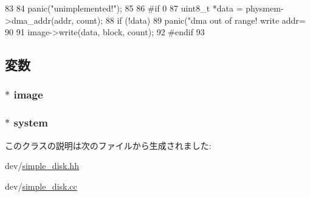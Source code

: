 \begin{DoxyCode}
83 {
84     panic("unimplemented!\n");
85 
86 #if 0
87     uint8_t *data = physmem->dma_addr(addr, count);
88     if (!data)
89         panic("dma out of range! write addr=%
90 
91     image->write(data, block, count);
92 #endif
93 }
\end{DoxyCode}


\subsection{変数}
\hypertarget{classSimpleDisk_a86d47120637a95e3a6876c774d768030}{
\subsubsection[{image}]{$\ast$ {\bf image}}}
\label{classSimpleDisk_a86d47120637a95e3a6876c774d768030}
\hypertarget{classSimpleDisk_af27ccd765f13a4b7bd119dc7579e2746}{
\subsubsection[{system}]{$\ast$ {\bf system}}}
\label{classSimpleDisk_af27ccd765f13a4b7bd119dc7579e2746}


このクラスの説明は次のファイルから生成されました:\begin{DoxyCompactItemize}
\item 
dev/\hyperlink{simple__disk_8hh}{simple\_\-disk.hh}\item 
dev/\hyperlink{simple__disk_8cc}{simple\_\-disk.cc}\end{DoxyCompactItemize}
